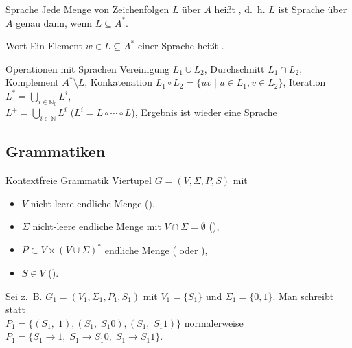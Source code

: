 \begin{Def}{Sprache}
    Jede Menge von Zeichenfolgen $L$ über $A$ heißt
    , d.~h. $L$ ist Sprache über $A$
    genau dann, wenn $L \subseteq A^\ast$.
\end{Def}

\begin{Def}{Wort}
    Ein Element $w \in L \subseteq A^\ast$ einer Sprache heißt .
\end{Def}

\begin{Def}{Operationen mit Sprachen}
    Vereinigung $L_1 \cup L_2$, Durchschnitt $L_1 \cap L_2$, \\
    Komplement $A^\ast \setminus L$,
    Konkatenation $L_1 \circ L_2 = \{uv \;|\;u \in L_1, v \in L_2\}$,
    Iteration $L^\ast = \bigcup_{i \in \mathbb{N}_0} L^i$, \\
    $L^+ = \bigcup_{i \in \mathbb{N}} L^i$ ($L^i = L \circ \cdots \circ L$),
    Ergebnis ist wieder eine Sprache
\end{Def}

\subsection{%
    Grammatiken%
}

\begin{Def}{Kontextfreie Grammatik}
    Viertupel $G = (V, \Sigma, P, S)$ mit
    \begin{itemize}
        \item $V$ nicht-leere endliche Menge
        (),
        
        \item $\Sigma$ nicht-leere endliche Menge mit
        $V \cap \Sigma = \emptyset$ (),
        
        \item $P \subset V \times (V \cup \Sigma)^\ast$ endliche Menge
        ( oder ),
        
        \item $S \in V$ ().
    \end{itemize}
    
    Sei z.~B. $G_1 = (V_1, \Sigma_1, P_1, S_1)$ mit $V_1 = \{S_1\}$ und
    $\Sigma_1 = \{0, 1\}$. Man schreibt statt \\
    $P_1 = \{(S_1,\; 1), (S_1,\; S_{1}0), (S_1,\; S_{1}1)\}$ normalerweise
    $P_1 = \{S_1 \rightarrow 1,\; S_1 \rightarrow S_{1}0,\;
    S_1 \rightarrow S_{1}1\}$.
\end{Def}


